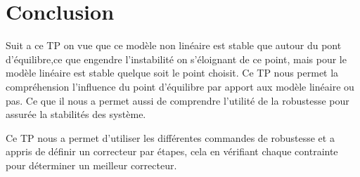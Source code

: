 \documentclass[12pt, a4paper, openany]{report}
\begin{document}
      
\chapter{Conclusion} 
      Suit a ce TP on vue que ce modèle non linéaire est stable que autour du pont d'équilibre,ce que engendre l'instabilité on s’éloignant de ce point, mais pour le modèle linéaire est stable quelque soit le point choisit.
      Ce TP nous permet la compréhension l’influence du point d’équilibre par apport aux modèle linéaire ou pas.
      Ce que il nous a permet aussi de comprendre l'utilité de la robustesse pour assurée la stabilités des système.   



Ce TP nous a permet d'utiliser les différentes commandes de robustesse et a appris de définir un correcteur par étapes, cela en vérifiant chaque contrainte pour déterminer un meilleur correcteur.\\










 







%
%
\end{document}
